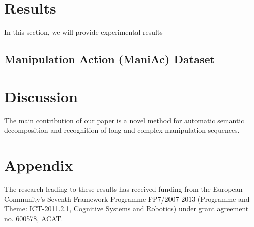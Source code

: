 \section{Results}
\label{sec:results}

In this section, we will provide experimental results 

\subsection{Manipulation Action (ManiAc) Dataset}
\label{sec:maniacdataset}
 
\section{Discussion}
\label{sec:discussion}

The main contribution of our paper is a novel method for automatic semantic decomposition and recognition of long and complex manipulation sequences.  


\section*{Appendix}
 

\begin{acknowledgements}
The research leading to these results has received funding from the European Community’s Seventh Framework Programme FP7/2007-2013 (Programme and Theme: ICT-2011.2.1, Cognitive Systems and Robotics) under grant agreement no. 600578, ACAT. 
\end{acknowledgements}





 




